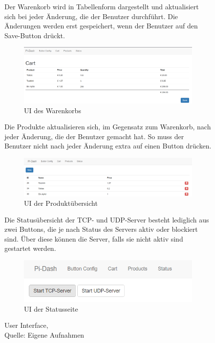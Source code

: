 \begin{figure}[!htb]
Der Warenkorb wird in Tabellenform dargestellt und aktualisiert sich bei jeder Änderung, die der Benutzer durchführt. Die Änderungen werden erst gespeichert, wenn der Benutzer auf den Save-Button drückt.	
  \begin{subfigure}{\linewidth}
	\centering
	\includegraphics[scale=0.4]{Bilder/ui_cart.png}
	\caption[UI des Warenkorbs]{UI des Warenkorbs}
  \end{subfigure}\par\medskip
  
Die Produkte aktualisieren sich, im Gegensatz zum Warenkorb, nach jeder Änderung, die der Benutzer gemacht hat. So muss der Benutzer nicht nach jeder Änderung extra auf einen Button drücken.

  \begin{subfigure}{\linewidth}	
	\centering
	\includegraphics[scale=0.4]{Bilder/ui_products.png}
	\caption[UI der Produktübersicht]{UI der Produktübersicht}
  \end{subfigure}\par\medskip
  
Die Statusübersicht der TCP- und UDP-Server besteht lediglich aus zwei Buttons, die je nach Status des Servers aktiv oder blockiert sind. Über diese können die Server, falls sie nicht aktiv sind gestartet werden.

  \begin{subfigure}{\linewidth}
	\centering
	\includegraphics[scale=0.8]{Bilder/ui_status.png}
	\caption[UI der Statusseite]{UI der Statusseite}
  \end{subfigure}
  \caption{User Interface,\\ Quelle: Eigene Aufnahmen}
\end{figure}

